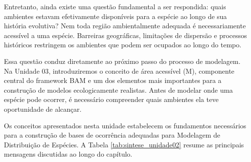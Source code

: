 Entretanto, ainda existe uma questão fundamental a ser respondida: quais ambientes estavam efetivamente disponíveis para a espécie ao longo de sua história evolutiva? Nem toda região ambientalmente adequada é necessariamente acessível a uma espécie. Barreiras geográficas, limitações de dispersão e processos históricos restringem os ambientes que podem ser ocupados ao longo do tempo.

Essa questão conduz diretamente ao próximo passo do processo de modelagem. Na Unidade 03, introduziremos o conceito de área acessível (M), componente central do framework BAM e um dos elementos mais importantes para a construção de modelos ecologicamente realistas. Antes de modelar onde uma espécie pode ocorrer, é necessário compreender quais ambientes ela teve oportunidade de alcançar.

Os conceitos apresentados nesta unidade estabelecem os fundamentos necessários para a construção de bases de ocorrência adequadas para Modelagem de Distribuição de Espécies. A Tabela \ref{tab:sintese_unidade02} resume as principais mensagens discutidas ao longo do capítulo.

